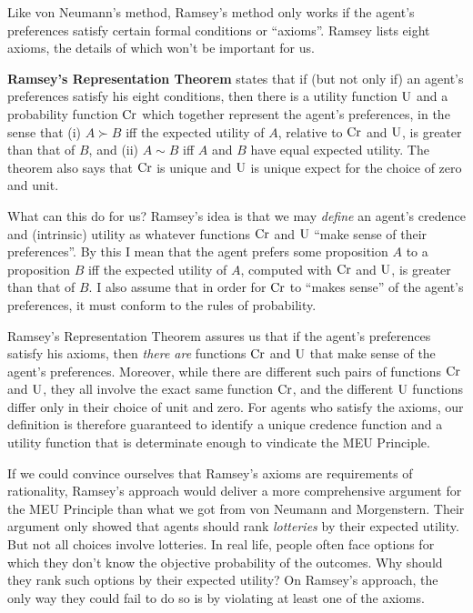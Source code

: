 Like von Neumann's method, Ramsey's method only works if the agent's preferences
satisfy certain formal conditions or ``axioms''. Ramsey lists eight axioms, the
details of which won't be important for us.

\textbf{Ramsey's Representation Theorem} states that if (but not only if) an
agent's preferences satisfy his eight conditions, then there is a utility
function $\text{U}$ and a probability function $\text{Cr}$ which together represent the
agent's preferences, in the sense that (i) $A \succ B$ iff the expected utility
of $A$, relative to $\text{Cr}$ and $\text{U}$, is greater than that of $B$, and (ii)
$A \sim B$ iff $A$ and $B$ have equal expected utility. The theorem also says
that $\text{Cr}$ is unique and $\text{U}$ is unique expect for the choice of zero and unit.

What can this do for us? Ramsey's idea is that we may \emph{define} an agent's
credence and (intrinsic) utility as whatever functions $\text{Cr}$ and $\text{U}$ ``make
sense of their preferences''. By this I mean that the agent prefers some
proposition $A$ to a proposition $B$ iff the expected utility of $A$, computed
with $\text{Cr}$ and $\text{U}$, is greater than that of $B$. I also assume that in order
for $\text{Cr}$ to ``makes sense'' of the agent's preferences, it must conform to the
rules of probability.

Ramsey's Representation Theorem assures us that if the agent's preferences
satisfy his axioms, then \emph{there are} functions $\text{Cr}$ and $\text{U}$ that make
sense of the agent's preferences. Moreover, while there are different such pairs
of functions $\text{Cr}$ and $\text{U}$, they all involve the exact same function $\text{Cr}$, and
the different $\text{U}$ functions differ only in their choice of unit and zero. For
agents who satisfy the axioms, our definition is therefore guaranteed to
identify a unique credence function and a utility function that is determinate
enough to vindicate the MEU Principle.

If we could convince ourselves that Ramsey's axioms are requirements of
rationality, Ramsey's approach would deliver a more comprehensive argument for
the MEU Principle than what we got from von Neumann and Morgenstern. Their
argument only showed that agents should rank \emph{lotteries} by their expected
utility. But not all choices involve lotteries. In real life, people often face
options for which they don't know the objective probability of the outcomes. Why
should they rank such options by their expected utility? On Ramsey's approach,
the only way they could fail to do so is by violating at least one of the
axioms.

